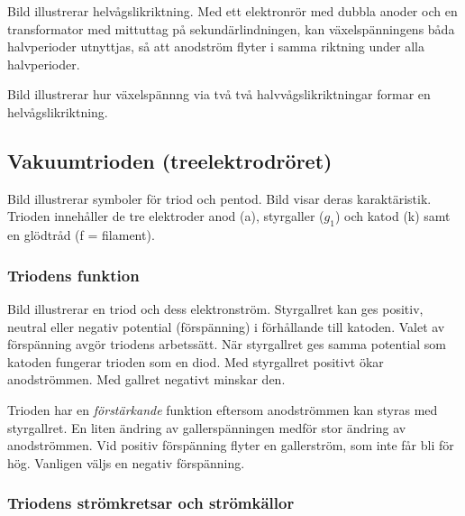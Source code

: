 Bild  illustrerar helvågslikriktning.
Med ett el\-ek\-tron\-rör med dubbla anoder och en transformator med mittuttag på
sekundärlindningen, kan växelspänningens båda halvperioder utnyttjas, så att
anodström flyter i samma riktning under alla halvperioder.


Bild  illustrerar hur växelspännng via två
två halvvågslikriktningar formar en helvågslikriktning.

\subsection{Vakuumtrioden (treelektrodröret)}

Bild  illustrerar symboler för triod och pentod. Bild 
visar deras karaktäristik.  Trioden innehåller de tre elektroder anod (a), styrgaller (\(g_1\)) och katod
(k) samt en glödtråd (f = filament).

\newpage
{}



\subsubsection{Triodens funktion}

Bild  illustrerar en triod och dess elektronström.
Styrgallret kan ges positiv, neutral eller negativ potential (förspänning) i
förhållande till katoden.
Valet av förspänning avgör triodens arbetssätt.
När styrgallret ges samma potential som katoden fungerar trioden som en diod.
Med styrgallret positivt ökar anodströmmen.
Med gallret negativt minskar den.

Trioden har en \emph{förstärkande} funktion eftersom anodströmmen kan styras med
styrgallret. En liten ändring av gallerspänningen medför stor ändring av anodströmmen.
Vid positiv förspänning flyter en gallerström, som inte får bli för hög.
Vanligen väljs en negativ förspänning.

\subsubsection{Triodens strömkretsar och strömkällor}

